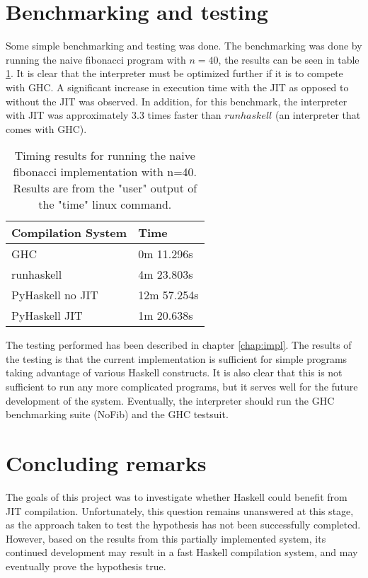 \section{Benchmarking and testing}

Some simple benchmarking and testing was done. The benchmarking was done by
running the naive fibonacci program with $n=40$, the results can be seen in
table \ref{tab:benchmarks}.
It is clear that the interpreter must be optimized 
further if it is to compete with GHC. A significant increase in execution 
time with the JIT as opposed to without the JIT was observed. In addition,
for this benchmark, the interpreter with JIT was approximately $3.3$ times faster than
$runhaskell$ (an interpreter that comes with GHC).

\begin{table}[H]

\centering
\begin{tabular}{l|l}
\hline
\hline
Compilation System & Time \\
\hline
GHC               & 0m 11.296s  \\
runhaskell        & 4m 23.803s \\ 
PyHaskell no JIT   & 12m 57.254s \\
PyHaskell JIT      & 1m 20.638s \\
\hline
\end{tabular}

\caption{Timing results for running the naive fibonacci implementation with n=40. Results
are from the "user" output of the "time" linux command.}
\label{tab:benchmarks}


\end{table}

The testing performed has been described in chapter \ref{chap:impl}. The results of the 
testing is that the current implementation is sufficient for simple programs taking 
advantage of various Haskell constructs. It is also clear that this is not sufficient
to run any more complicated programs, but it serves well for the future development of
the system. Eventually, the interpreter should run the GHC benchmarking suite (NoFib) and 
the GHC testsuit.

\section{Concluding remarks}


The goals of this project was to investigate whether Haskell could benefit from JIT 
compilation. Unfortunately, this question remains unanswered at this stage, as the
approach taken to test the hypothesis has not been successfully completed. However,
based on the results from this partially implemented system, its continued
development may result in a fast Haskell compilation system, and may eventually prove
the hypothesis true.


